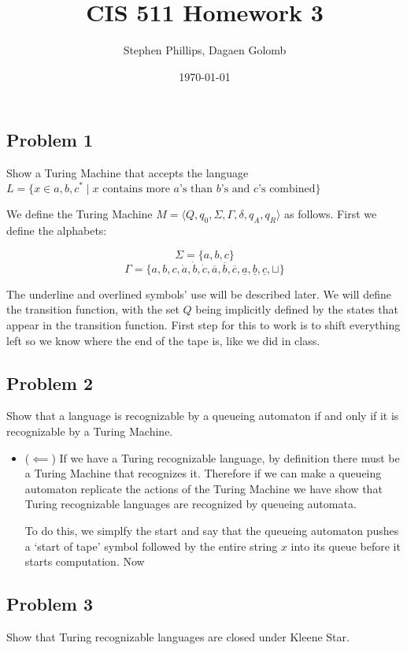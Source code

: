 \documentclass[english]{article}
\title{CIS 511 Homework 3}
\author{Stephen Phillips, Dagaen Golomb}
\date{\today }
\newcommand{\ol}[1]{ \overline{#1} }
\newcommand{\ul}[1]{ \underline{#1} }
\begin{document}
\maketitle
\subsection*{Problem 1}
Show a Turing Machine that accepts the language
 $L = \{ x \in {a,b,c}^* \mid 
         \textrm{$x$ contains more $a$'s than $b$'s and $c$'s combined} \}$

We define the Turing Machine 
$M = \langle Q,q_0,\Sigma,\Gamma,\delta,q_A, q_R \rangle $ as follows. First
we define the alphabets:

\[ \Sigma = \{a,b,c\} \]
\[ \Gamma = \{a,b,c,\dot{a},\dot{b},\dot{c},
          \ol{a},\ol{b},\ol{c},
          \ul{a},\ul{b},\ul{c}, \sqcup \} \]

The underline and overlined symbols' use will be described later. We will
define the transition function, with the set $Q$ being implicitly defined
by the states that appear in the transition function. First step for this
to work is to shift everything left so we know where the end of the tape
is, like we did in class. 

\subsection*{Problem 2}
Show that a language is recognizable by a queueing automaton if and only if it
is recognizable by a Turing Machine.
\begin{itemize}
\item ($ \impliedby $) If we have a Turing recognizable language, by
  definition there must be a Turing Machine that recognizes it. Therefore if
  we can make a queueing automaton replicate the actions of the Turing Machine
  we have show that Turing recognizable languages are recognized by queueing
  automata.

  To do this, we simplfy the start and say that the queueing automaton pushes
  a `start of tape' symbol followed by the entire string $x$ into its queue before
  it starts computation. Now
\end{itemize}

\subsection*{Problem 3}
Show that Turing recognizable languages are closed under Kleene Star.
\end{document}
